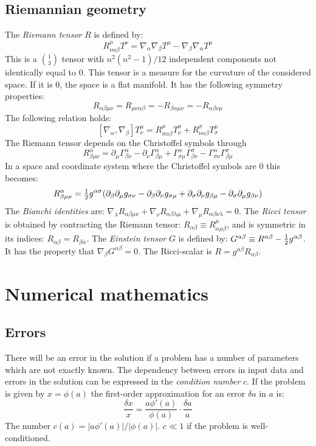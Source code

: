 \documentclass[a4paper,fancyheadings,twoside]{report}
\begin{document}
\section{Riemannian geometry}
The {\it Riemann tensor} $R$ is defined by:
\[
R^\mu_{\nu\alpha\beta}T^\nu=\nabla_\alpha\nabla_\beta T^\mu-\nabla_\beta\nabla_\alpha T^\mu
\]
This is a $1\choose 3$ tensor with $n^2(n^2-1)/12$ independent components not
identically equal to 0. This tensor is a measure for the curvature of the
considered space. If it is 0, the space is a flat manifold. It has the
following symmetry properties:
\[
R_{\alpha\beta\mu\nu}=R_{\mu\nu\alpha\beta}=-R_{\beta\alpha\mu\nu}=-R_{\alpha\beta\nu\mu}
\]
The following relation holds:
\[
[\nabla_\alpha,\nabla_\beta]T_\nu^\mu=R_{\sigma\alpha\beta}^\mu T_\nu^\sigma+R_{\nu\alpha\beta}^\sigma T_\sigma^\mu
\]
The Riemann tensor depends on the Christoffel symbols through
\[
R^\alpha_{\beta\mu\nu}=\partial_\mu\Gamma^\alpha_{\beta\nu}-\partial_\nu\Gamma^\alpha_{\beta\mu}+\Gamma^\alpha_{\sigma\mu}\Gamma^\sigma_{\beta\nu}-\Gamma^\alpha_{\sigma\nu}\Gamma^\sigma_{\beta\mu}
\]
In a space and coordinate system where the Christoffel symbols are 0 this
becomes:
\[
R^\alpha_{\beta\mu\nu}=\mbox{$\frac{1}{2}$} g^{\alpha\sigma}(\partial_\beta\partial_\mu g_{\sigma\nu}-\partial_\beta\partial_\nu g_{\sigma\mu}+\partial_\sigma\partial_\nu g_{\beta\mu}-\partial_\sigma\partial_\mu g_{\beta\nu})
\]
The {\it Bianchi identities} are: $\nabla_\lambda R_{\alpha\beta\mu\nu}+\nabla_\nu R_{\alpha\beta\lambda\mu} +\nabla_\mu R_{\alpha\beta\nu\lambda}=0$.
\npar
The {\it Ricci tensor} is obtained by contracting the Riemann tensor:
$R_{\alpha\beta}\equiv R_{\alpha\mu\beta}^\mu$, and is symmetric in its
indices: $R_{\alpha\beta}=R_{\beta\alpha}$. The {\it Einstein tensor} $G$ is
defined by: $G^{\alpha\beta}\equiv R^{\alpha\beta}-\mbox{$\frac{1}{2}$} g^{\alpha\beta}$.
It has the property that $\nabla_\beta G^{\alpha\beta}=0$. The Ricci-scalar is
$R=g^{\alpha\beta}R_{\alpha\beta}$.


\chapter{Numerical mathematics}
\label{chap:num}
\section{Errors}
There will be an error in the solution if a problem has a number of parameters
which are not exactly known. The dependency between errors in input data and
errors in the solution can be expressed in the {\it condition number} $c$. If
the problem is given by $x=\phi(a)$ the first-order approximation for an error
$\delta a$ in $a$ is:
\[
\frac{\delta x}{x}=\frac{a\phi'(a)}{\phi(a)}\cdot\frac{\delta a}{a}
\]
The number $c(a)=|a\phi'(a)|/|\phi(a)|$. $c\ll1$ if the problem is
well-conditioned.
\end{document}
